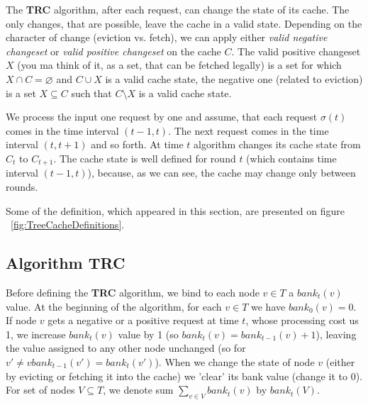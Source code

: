 The \textbf{TRC} algorithm, after each request, can change the state of its 
cache. The only changes, that are possible, leave the cache in a valid state. 
Depending on the character of change (eviction vs. fetch), we can apply either 
\textit{valid negative changeset} or \textit{valid positive changeset}  on the 
cache $C$. The valid positive changeset $X$ (you ma think of it, as a set, that 
can be fetched legally) is a set for which $X \cap C = \varnothing$ and $C \cup X$ 
is a valid cache state, the negative one (related to eviction) is a set $X 
\subseteq C$ such that $C \setminus X$ is a valid cache state.

We process the input one request by one and assume, that each request $\sigma(t)$ 
comes in the time interval $(t-1, t)$. The next request comes in the time 
interval $(t, t + 1)$ and so forth. At time $t$ algorithm changes its cache state 
from $C_{t}$ to $C_{t+1}$. The cache state is well defined for round $t$ (which 
contains time interval $(t-1, t)$), because, as we can see, the cache may change 
only between rounds.

Some of the definition, which appeared in this section, are presented on figure 
~\ref{fig:TreeCacheDefinitions}.

\subsection{Algorithm TRC}

Before defining the \textbf{TRC} algorithm, we bind to each node $v \in 
T$ a $bank_{t}(v)$ value. At the beginning of the algorithm, for each $v \in T$ we 
have $bank_{0}(v) = 0$. If node $v$ gets a negative or a positive request at 
time $t$, whose processing cost us 1, we increase $bank_{t}(v)$ value by 1 
(so $bank_{t}(v) = bank_{t-1}(v) + 1$), leaving the value assigned to any other 
node unchanged (so for $v' \neq v bank_{t-1}(v') = bank_{t}(v')$). When we change 
the state of node $v$ (either by evicting or fetching it into the cache) we 'clear' 
its bank value (change it to $0$). For set of nodes $V \subseteq T$, we denote sum 
$\sum_{v \in V} bank_{t}(v)$ by $bank_{t}(V)$.

